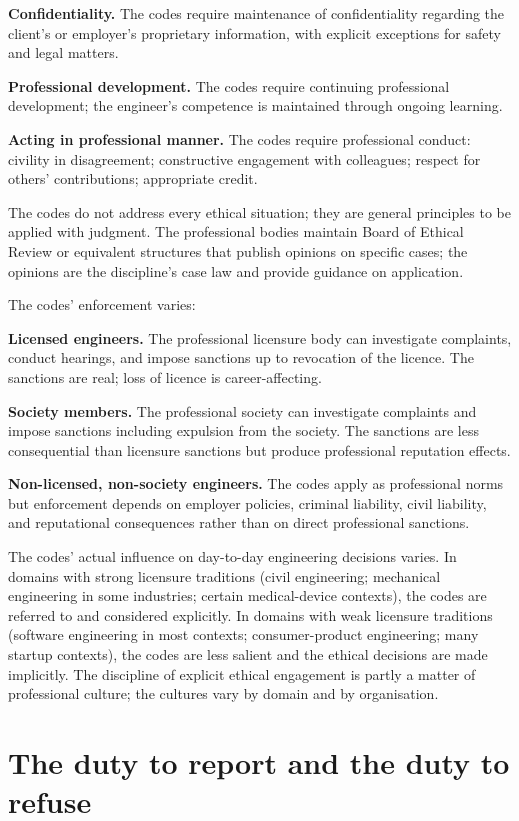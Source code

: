 \textbf{Confidentiality.} The codes require maintenance of confidentiality regarding the client's or employer's proprietary information, with explicit exceptions for safety and legal matters.

\textbf{Professional development.} The codes require continuing professional development; the engineer's competence is maintained through ongoing learning.

\textbf{Acting in professional manner.} The codes require professional conduct: civility in disagreement; constructive engagement with colleagues; respect for others' contributions; appropriate credit.

The codes do not address every ethical situation; they are general principles to be applied with judgment. The professional bodies maintain Board of Ethical Review or equivalent structures that publish opinions on specific cases; the opinions are the discipline's case law and provide guidance on application.

The codes' enforcement varies:

\textbf{Licensed engineers.} The professional licensure body can investigate complaints, conduct hearings, and impose sanctions up to revocation of the licence. The sanctions are real; loss of licence is career-affecting.

\textbf{Society members.} The professional society can investigate complaints and impose sanctions including expulsion from the society. The sanctions are less consequential than licensure sanctions but produce professional reputation effects.

\textbf{Non-licensed, non-society engineers.} The codes apply as professional norms but enforcement depends on employer policies, criminal liability, civil liability, and reputational consequences rather than on direct professional sanctions.

The codes' actual influence on day-to-day engineering decisions varies. In domains with strong licensure traditions (civil engineering; mechanical engineering in some industries; certain medical-device contexts), the codes are referred to and considered explicitly. In domains with weak licensure traditions (software engineering in most contexts; consumer-product engineering; many startup contexts), the codes are less salient and the ethical decisions are made implicitly. The discipline of explicit ethical engagement is partly a matter of professional culture; the cultures vary by domain and by organisation.

\section{The duty to report and the duty to refuse}

